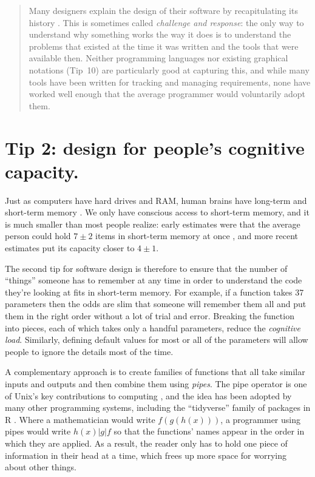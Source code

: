 \documentclass[10pt,letterpaper]{article}
\begin{document}
\begin{quotation}
  \noindent
  Many designers explain the design of their software
  by recapitulating its history \cite{Brown2011,Brown2012}.
  This is sometimes called \emph{challenge and response}:
  the only way to understand why something works the way it does
  is to understand the problems that existed at the time it was written
  and the tools that were available then.
  Neither programming languages nor existing graphical notations (Tip~10)
  are particularly good at capturing this,
  and while many tools have been written for tracking and managing requirements,
  none have worked well enough that the average programmer would voluntarily adopt them.
\end{quotation}

\section*{Tip 2: design for people's cognitive capacity.}

Just as computers have hard drives and RAM,
human brains have long-term and short-term memory \cite{Hermans2021}.
We only have conscious access to short-term memory,
and it is much smaller than most people realize:
early estimates were that the average person could hold
$7{\pm}2$ items in short-term memory at once \cite{Miller1956},
and more recent estimates put its capacity closer to $4{\pm}1$.

The second tip for software design is therefore
to ensure that the number of ``things'' someone has to remember at any time
in order to understand the code they're looking at
fits in short-term memory.
For example,
if a function takes 37 parameters
then the odds are slim
that someone will remember them all and put them in the right order
without a lot of trial and error.
Breaking the function into pieces,
each of which takes only a handful parameters,
reduce the \emph{cognitive load}.
Similarly,
defining default values for most or all of the parameters
will allow people to ignore the details most of the time.

A complementary approach is to create families of functions
that all take similar inputs and outputs
and then combine them using \emph{pipes}.
The pipe operator is one of Unix's key contributions to computing \cite{Kernighan2019},
and the idea has been adopted by many other programming systems,
including the ``tidyverse'' family of packages in R \cite{Wickham2017}.
Where a mathematician would write $f(g(h(x)))$,
a programmer using pipes would write $h(x) | g | f$
so that the functions' names appear in the order in which they are applied.
As a result,
the reader only has to hold one piece of information in their head at a time,
which frees up more space for worrying about other things.
\end{document}
